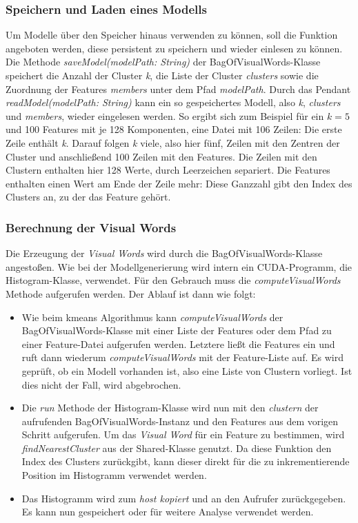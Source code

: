 \subsubsection{Speichern und Laden eines Modells}

Um Modelle über den Speicher hinaus verwenden zu können, soll die Funktion angeboten werden, diese persistent zu speichern und wieder einlesen zu können. Die Methode \textit{saveModel(modelPath: String)} der BagOfVisualWords-Klasse speichert die Anzahl der Cluster \textit{k}, die Liste der Cluster \textit{clusters} sowie die Zuordnung der Features \textit{members} unter dem Pfad \textit{modelPath}. Durch das Pendant \textit{readModel(modelPath: String)} kann ein so gespeichertes Modell, also \textit{k}, \textit{clusters} und \textit{members}, wieder eingelesen werden.\newline
So ergibt sich zum Beispiel für ein $k = 5$ und 100 Features mit je 128 Komponenten, eine Datei mit 106 Zeilen: Die erste Zeile enthält \textit{k}. Darauf folgen \textit{k} viele, also hier fünf, Zeilen mit den Zentren der Cluster und anschließend 100 Zeilen mit den Features. Die Zeilen mit den Clustern enthalten hier 128 Werte, durch Leerzeichen separiert. Die Features enthalten einen Wert am Ende der Zeile mehr: Diese Ganzzahl gibt den Index des Clusters an, zu der das Feature gehört.

\subsubsection{Berechnung der Visual Words}

Die Erzeugung der \textit{Visual Words} wird durch die BagOfVisualWords-Klasse angestoßen. Wie bei der Modellgenerierung wird intern ein CUDA-Programm, die Histogram-Klasse, verwendet. Für den Gebrauch muss die \textit{computeVisualWords} Methode aufgerufen werden. Der Ablauf ist dann wie folgt:

\begin{itemize}
	\item Wie beim kmeans Algorithmus kann \textit{computeVisualWords} der BagOfVisualWords-Klasse mit einer Liste der Features oder dem Pfad zu einer Feature-Datei aufgerufen werden. Letztere ließt die Features ein und ruft dann wiederum \textit{computeVisualWords} mit der Feature-Liste auf. Es wird geprüft, ob ein Modell vorhanden ist, also eine Liste von Clustern vorliegt. Ist dies nicht der Fall, wird abgebrochen.
	\item Die \textit{run} Methode der Histogram-Klasse wird nun mit den \textit{clustern} der aufrufenden BagOfVisualWords-Instanz und den Features aus dem vorigen Schritt aufgerufen. Um das \textit{Visual Word} für ein Feature zu bestimmen, wird \textit{findNearestCluster} aus der Shared-Klasse genutzt. Da diese Funktion den Index des Clusters zurückgibt, kann dieser direkt für die zu inkrementierende Position im Histogramm verwendet werden.
	\item Das Histogramm wird zum \textit{host kopiert} und an den Aufrufer zurückgegeben. Es kann nun gespeichert oder für weitere Analyse verwendet werden.
\end{itemize}